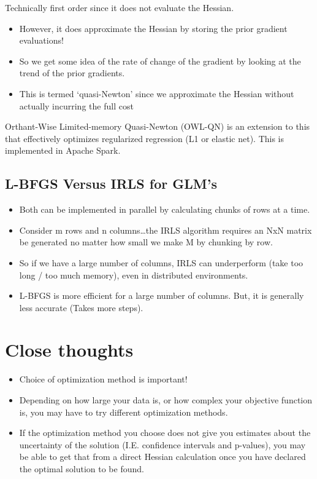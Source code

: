\documentclass[fontset=fandol,zihao=false,scheme=chinese,heading=true,UTF8]{ctexbook}
\providecommand{\tightlist}{%
  \setlength{\itemsep}{0pt}\setlength{\parskip}{0pt}}
\begin{document}
Technically first order since it does not evaluate the Hessian.

\begin{itemize}
\tightlist
\item
  However, it does approximate the Hessian by storing the prior gradient evaluations!
\item
  So we get some idea of the rate of change of the gradient by looking at the trend of the prior gradients.
\item
  This is termed `quasi-Newton' since we approximate the Hessian without actually incurring the full cost
\end{itemize}

Orthant-Wise Limited-memory Quasi-Newton (OWL-QN) is an extension to this that effectively optimizes regularized regression (L1 or elastic net). This is implemented in Apache Spark.

\hypertarget{l-bfgs-versus-irls-for-glms}{%
\subsection{L-BFGS Versus IRLS for GLM's}\label{l-bfgs-versus-irls-for-glms}}

\begin{itemize}
\tightlist
\item
  Both can be implemented in parallel by calculating chunks of rows at a time.
\item
  Consider m rows and n columns\ldots{}the IRLS algorithm requires an NxN matrix be generated no matter how small we make M by chunking by row.
\item
  So if we have a large number of columns, IRLS can underperform (take too long / too much memory), even in distributed environments.
\item
  L-BFGS is more efficient for a large number of columns. But, it is generally less accurate (Takes more steps).
\end{itemize}

\hypertarget{close-thoughts}{%
\section{Close thoughts}\label{close-thoughts}}

\begin{itemize}
\tightlist
\item
  Choice of optimization method is important!
\item
  Depending on how large your data is, or how complex your objective function is, you may have to try different optimization methods.
\item
  If the optimization method you choose does not give you estimates about the uncertainty of the solution (I.E. confidence intervals and p-values), you may be able to get that from a direct Hessian calculation once you have declared the optimal solution to be found.
\end{itemize}
\end{document}
